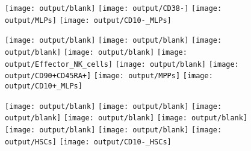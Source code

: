 \documentclass[11pt]{article}
\begin{document}
\begin{figure}[htbp]
\begin{minipage}[t]{0.125\textwidth}
    \texttt{[image: output/blank]}
    \texttt{[image: output/CD38-]}
    \texttt{[image: output/MLPs]}
    \texttt{[image: output/CD10-\_MLPs]}
  \end{minipage}%
  \begin{minipage}[t]{0.125\textwidth}
    \centering
    \texttt{[image: output/blank]}
    \texttt{[image: output/blank]}
    \texttt{[image: output/blank]}
    \texttt{[image: output/blank]}
    \texttt{[image: output/Effector\_NK\_cells]}
    \texttt{[image: output/blank]}
    \texttt{[image: output/CD90+CD45RA+]}
    \texttt{[image: output/MPPs]}
    \texttt{[image: output/CD10+\_MLPs]}

  \end{minipage}%
  \begin{minipage}[t]{0.125\textwidth}
    \centering
    \vspace{-0.3871\linewidth} %
    \texttt{[image: output/blank]}
    \texttt{[image: output/blank]}
    \texttt{[image: output/blank]}
    \texttt{[image: output/blank]}
    \texttt{[image: output/blank]}
    \texttt{[image: output/blank]}
    \texttt{[image: output/blank]}
    \texttt{[image: output/HSCs]}
    \texttt{[image: output/CD10-\_HSCs]}


  \end{minipage}%
  \label{fig:figure}
\end{figure}
\end{document}
